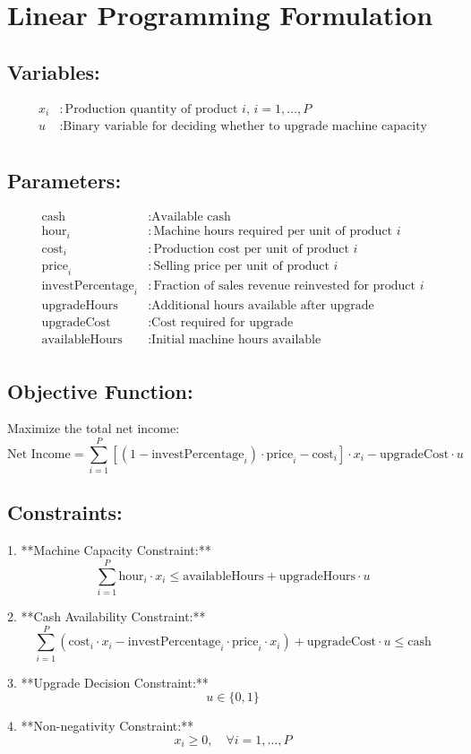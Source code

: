 \documentclass{article}
\begin{document}
\section*{Linear Programming Formulation}

\subsection*{Variables:}
\begin{align*}
x_i & : \text{Production quantity of product } i, \, i = 1, \ldots, P \\
u & : \text{Binary variable for deciding whether to upgrade machine capacity} \\
\end{align*}

\subsection*{Parameters:}
\begin{align*}
\text{cash} & : \text{Available cash} \\
\text{hour}_i & : \text{Machine hours required per unit of product } i \\
\text{cost}_i & : \text{Production cost per unit of product } i \\
\text{price}_i & : \text{Selling price per unit of product } i \\
\text{investPercentage}_i & : \text{Fraction of sales revenue reinvested for product } i \\
\text{upgradeHours} & : \text{Additional hours available after upgrade} \\
\text{upgradeCost} & : \text{Cost required for upgrade} \\
\text{availableHours} & : \text{Initial machine hours available} \\
\end{align*}

\subsection*{Objective Function:}
Maximize the total net income:
\[
\text{Net Income} = \sum_{i=1}^{P} \left[ (1 - \text{investPercentage}_i)\cdot\text{price}_i - \text{cost}_i \right] \cdot x_i - \text{upgradeCost} \cdot u
\]

\subsection*{Constraints:}
1. **Machine Capacity Constraint:**
\[
\sum_{i=1}^{P} \text{hour}_i \cdot x_i \leq \text{availableHours} + \text{upgradeHours} \cdot u
\]

2. **Cash Availability Constraint:**
\[
\sum_{i=1}^{P} \left( \text{cost}_i \cdot x_i - \text{investPercentage}_i \cdot \text{price}_i \cdot x_i \right) + \text{upgradeCost} \cdot u \leq \text{cash}
\]

3. **Upgrade Decision Constraint:**
\[
u \in \{0, 1\}
\]

4. **Non-negativity Constraint:**
\[
x_i \geq 0, \quad \forall i = 1, \ldots, P
\]
\end{document}
